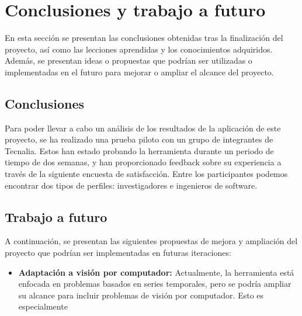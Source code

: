 \section{Conclusiones y trabajo a futuro}
En esta sección se presentan las conclusiones obtenidas tras la finalización 
del proyecto, así como las lecciones aprendidas y los conocimientos adquiridos. 
Además, se presentan ideas o propuestas que podrían ser utilizadas o implementadas 
en el futuro para mejorar o ampliar el alcance del proyecto.

\subsection{Conclusiones}
Para poder llevar a cabo un análisis de los resultados de la aplicación
de este proyecto, se ha realizado una prueba piloto con un grupo de integrantes
de Tecnalia. Estos han estado probando la herramienta durante un periodo de tiempo
de dos semanas, y han proporcionado feedback sobre su experiencia a través de
la siguiente encuesta de satisfacción. Entre los participantes podemos encontrar
dos tipos de perfiles: investigadores e ingenieros de software. 

\subsection{Trabajo a futuro}
A continuación, se presentan las siguientes propuestas de mejora y ampliación
del proyecto que podrían ser implementadas en futuras iteraciones:

\begin{itemize}
    \item \textbf{Adaptación a visión por computador:} Actualmente, la herramienta
    está enfocada en problemas basados en series temporales, pero se podría ampliar
    su alcance para incluir problemas de visión por computador. Esto es especialmente
\end{itemize}